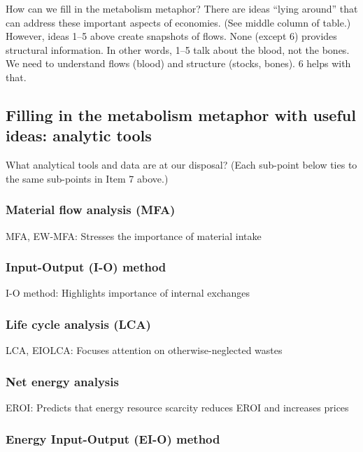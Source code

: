 How can we fill in the metabolism metaphor? There are ideas “lying around” that can address these important aspects of economies. (See middle column of table.) However, ideas 1–5 above create snapshots of flows. None (except 6) provides structural information. In other words, 1–5 talk about the blood, not the bones. We need to understand flows (blood) and structure (stocks, bones). 6 helps with that.


\subsection{Filling in the metabolism metaphor with useful ideas: analytic tools}
\label{sec:analytic_tools}

What analytical tools and data are at our disposal?
(Each sub-point below ties to the same sub-points in Item 7 above.)

\subsubsection{Material flow analysis (MFA)}
\label{sec:MFA}

MFA, EW-MFA: Stresses the importance of material intake

\subsubsection{Input-Output (I-O) method}
\label{sec:I-O}

I-O method: Highlights importance of internal exchanges

\subsubsection{Life cycle analysis (LCA)}
\label{sec:LCA}

LCA, EIOLCA: Focuses attention on otherwise-neglected wastes

\subsubsection{Net energy analysis}
\label{sec:NEA}

EROI: Predicts that energy resource scarcity reduces EROI and increases prices

\subsubsection{Energy Input-Output (EI-O) method}
\label{sec:EI-O}

